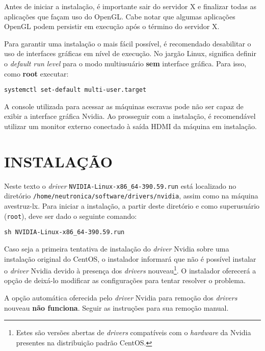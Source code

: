 \documentclass[twoside,a4paper,12pt,english]{inac17}
\begin{document}
Antes de iniciar a instalação, é importante sair do servidor X e 
finalizar todas as aplicações que façam uso do OpenGL. Cabe notar 
que algumas aplicações OpenGL podem persistir em execução após 
o término do servidor X.

Para garantir uma instalação o mais fácil possível, é recomendado 
desabilitar o uso de interfaces gráficas em nível de execução. No 
jargão Linux, significa definir o \textit{default run level} para 
o modo multiusuário \textbf{sem} interface gráfica. Para isso, 
como \textbf{root} executar:

\texttt{systemctl set-default multi-user.target}

\begin{shadedbox}
A console utilizada para acessar as máquinas escravas pode não ser capaz 
de exibir a interface gráfica Nvidia. Ao prosseguir com a instalação, é recomendável 
utilizar um monitor externo conectado à saída HDMI da máquina em instalação.
\end{shadedbox}

\section{INSTALAÇÃO}\label{inst}

Neste texto o \textit{driver} \texttt{NVIDIA-Linux-x86\_64-390.59.run} está localizado no diretório \texttt{/home/neutronica/software/drivers/nvidia}, assim 
como na máquina avestruz-lx. Para iniciar a instalação, a partir 
deste diretório e como superusuário (\texttt{root}), deve ser dado o 
seguinte comando:

\texttt{sh NVIDIA-Linux-x86\_64-390.59.run}

Caso seja a primeira tentativa de instalação do \textit{driver} Nvidia sobre uma 
instalação original do CentOS, o instalador informará que não é possível instalar 
o \textit{driver} Nvidia devido à presença dos \textit{drivers} nouveau\footnote{Estes são versões abertas de \textit{drivers} compatíveis com o \textit{hardware} da Nvidia presentes na distribuição padrão CentOS.}. O instalador 
oferecerá a opção de deixá-lo modificar as configurações para tentar resolver 
o problema. 

\begin{shadedbox}
A opção automática oferecida pelo \textit{driver} Nvidia para remoção dos 
\textit{drivers} nouveau \textbf{não funciona}. Seguir as instruções para sua 
remoção manual.
\end{shadedbox}
\end{document}
